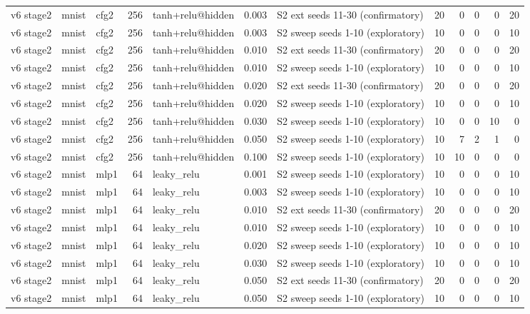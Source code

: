 \begin{table}[htbp]
{\begin{tabular}{@{}lllrlrlrrrrr@{}}
v6 stage2 & mnist & cfg2 & 256 & tanh+relu@hidden & 0.003 & S2 ext seeds 11-30 (confirmatory) & 20 & 0 & 0 & 0 & 20 \\
v6 stage2 & mnist & cfg2 & 256 & tanh+relu@hidden & 0.003 & S2 sweep seeds 1-10 (exploratory) & 10 & 0 & 0 & 0 & 10 \\
v6 stage2 & mnist & cfg2 & 256 & tanh+relu@hidden & 0.010 & S2 ext seeds 11-30 (confirmatory) & 20 & 0 & 0 & 0 & 20 \\
v6 stage2 & mnist & cfg2 & 256 & tanh+relu@hidden & 0.010 & S2 sweep seeds 1-10 (exploratory) & 10 & 0 & 0 & 0 & 10 \\
v6 stage2 & mnist & cfg2 & 256 & tanh+relu@hidden & 0.020 & S2 ext seeds 11-30 (confirmatory) & 20 & 0 & 0 & 0 & 20 \\
v6 stage2 & mnist & cfg2 & 256 & tanh+relu@hidden & 0.020 & S2 sweep seeds 1-10 (exploratory) & 10 & 0 & 0 & 0 & 10 \\
v6 stage2 & mnist & cfg2 & 256 & tanh+relu@hidden & 0.030 & S2 sweep seeds 1-10 (exploratory) & 10 & 0 & 0 & 10 & 0 \\
v6 stage2 & mnist & cfg2 & 256 & tanh+relu@hidden & 0.050 & S2 sweep seeds 1-10 (exploratory) & 10 & 7 & 2 & 1 & 0 \\
v6 stage2 & mnist & cfg2 & 256 & tanh+relu@hidden & 0.100 & S2 sweep seeds 1-10 (exploratory) & 10 & 10 & 0 & 0 & 0 \\
v6 stage2 & mnist & mlp1 & 64 & leaky\_relu & 0.001 & S2 sweep seeds 1-10 (exploratory) & 10 & 0 & 0 & 0 & 10 \\
v6 stage2 & mnist & mlp1 & 64 & leaky\_relu & 0.003 & S2 sweep seeds 1-10 (exploratory) & 10 & 0 & 0 & 0 & 10 \\
v6 stage2 & mnist & mlp1 & 64 & leaky\_relu & 0.010 & S2 ext seeds 11-30 (confirmatory) & 20 & 0 & 0 & 0 & 20 \\
v6 stage2 & mnist & mlp1 & 64 & leaky\_relu & 0.010 & S2 sweep seeds 1-10 (exploratory) & 10 & 0 & 0 & 0 & 10 \\
v6 stage2 & mnist & mlp1 & 64 & leaky\_relu & 0.020 & S2 sweep seeds 1-10 (exploratory) & 10 & 0 & 0 & 0 & 10 \\
v6 stage2 & mnist & mlp1 & 64 & leaky\_relu & 0.030 & S2 sweep seeds 1-10 (exploratory) & 10 & 0 & 0 & 0 & 10 \\
v6 stage2 & mnist & mlp1 & 64 & leaky\_relu & 0.050 & S2 ext seeds 11-30 (confirmatory) & 20 & 0 & 0 & 0 & 20 \\
v6 stage2 & mnist & mlp1 & 64 & leaky\_relu & 0.050 & S2 sweep seeds 1-10 (exploratory) & 10 & 0 & 0 & 0 & 10 \\

\end{tabular}}
\end{table}
